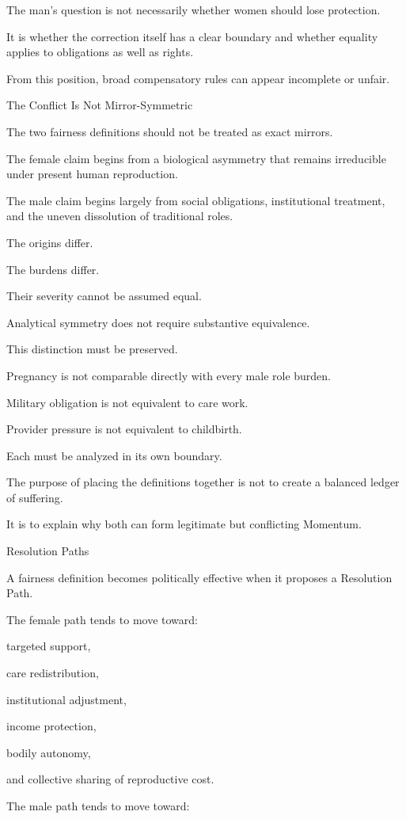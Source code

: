 The man’s question is not necessarily whether women should lose protection.

It is whether the correction itself has a clear boundary and whether equality applies to obligations as well as rights.

From this position, broad compensatory rules can appear incomplete or unfair.

The Conflict Is Not Mirror-Symmetric

The two fairness definitions should not be treated as exact mirrors.

The female claim begins from a biological asymmetry that remains irreducible under present human reproduction.

The male claim begins largely from social obligations, institutional treatment, and the uneven dissolution of traditional roles.

The origins differ.

The burdens differ.

Their severity cannot be assumed equal.

Analytical symmetry does not require substantive equivalence.

This distinction must be preserved.

Pregnancy is not comparable directly with every male role burden.

Military obligation is not equivalent to care work.

Provider pressure is not equivalent to childbirth.

Each must be analyzed in its own boundary.

The purpose of placing the definitions together is not to create a balanced ledger of suffering.

It is to explain why both can form legitimate but conflicting Momentum.

Resolution Paths

A fairness definition becomes politically effective when it proposes a Resolution Path.

The female path tends to move toward:

targeted support,

care redistribution,

institutional adjustment,

income protection,

bodily autonomy,

and collective sharing of reproductive cost.

The male path tends to move toward:

